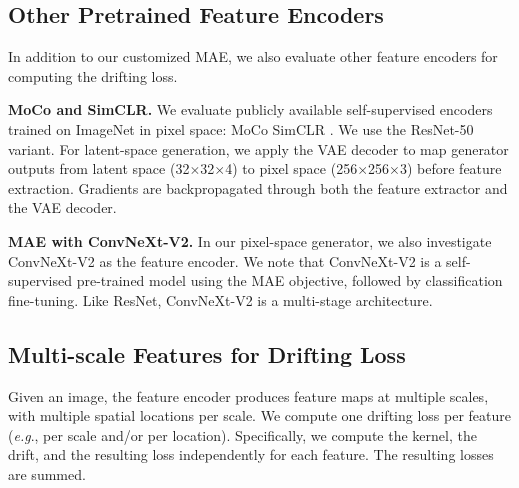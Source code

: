 \documentclass{article}
\renewcommand{\paragraph}[1]{\vspace{.05em}\noindent\textbf{#1}}
\def\onedot{.}
\def\eg{\emph{e.g}\onedot} \def\Eg{\emph{E.g}\onedot}
\theoremstyle{plain}
\theoremstyle{definition}
\theoremstyle{remark}
\begin{document}
\subsection{Other Pretrained Feature Encoders}
\label{sec:appendix_other_encoders}

In addition to our customized MAE, we also evaluate other feature encoders for computing the drifting loss.

\paragraph{MoCo and SimCLR.} We evaluate publicly available self-supervised encoders trained on ImageNet in pixel space: MoCo \cite{he2020momentum,chen2020improved} SimCLR \cite{chen2020simple}. We use the ResNet-50 variant.
For latent-space generation, we apply the VAE decoder to map generator outputs from latent space (32${\times}$32${\times}$4) to pixel space (256${\times}$256${\times}$3) before feature extraction.
Gradients are backpropagated through both the feature extractor and the VAE decoder.

\paragraph{MAE with ConvNeXt-V2.} In our pixel-space generator, we also investigate ConvNeXt-V2 \citep{woo2023convnext} as the feature encoder. We note that ConvNeXt-V2 is a self-supervised pre-trained model using the MAE objective, followed by classification fine-tuning. Like ResNet, ConvNeXt-V2 is a multi-stage architecture.

\subsection{Multi-scale Features for Drifting Loss}
\label{sec:appendix_feature_extraction}

Given an image, the feature encoder produces feature maps at multiple scales, with multiple spatial locations per scale.
We compute one drifting loss per feature (\eg, per scale and/or per location).
Specifically, we compute the kernel, the drift, and the resulting loss independently for each feature. The resulting losses are summed.
\end{document}
